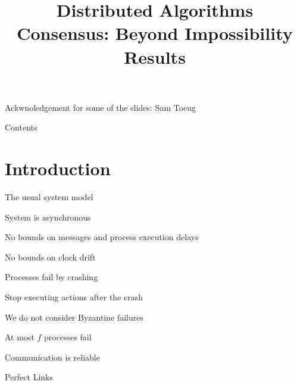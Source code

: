 
\title[DS - FD \& Consensus]{\textbf{Distributed Algorithms}\\Consensus: Beyond Impossibility Results}





\newcommand{\Crashed}{\mathit{crashed}}
\newcommand{\Correct}{\mathit{correct}}
\newcommand{\Suspected}{\mathit{suspected}}
\newcommand{\Est}{\mathit{est}}
\newcommand{\Aux}{\mathit{aux}}
\newcommand{\Rec}{\mathit{rec}}
\newcommand{\Proc}{\mathit{proc}}
\newcommand{\Stop}{\mathit{stop}}

\newcommand{\SUSPECT}{\textsc{suspect}}
\newcommand{\PHASEA}{\textsc{phase1}}
\newcommand{\PHASEB}{\textsc{phase2}}
\newcommand{\DECIDE}{\textsc{decide}}
\newcommand{\REPORT}{\textsc{report}}
\newcommand{\PROPOSAL}{\textsc{proposal}}

\newcommand{\Random}{\fontproc{random}}

\begin{frame}
\titlepage

Ackwnoledgement for some of the slides: Sam Toeug



\end{frame}

\begin{frame}[shrink]{Contents}
\tableofcontents
\end{frame}



\section{Introduction}

\begin{frame}{The usual system model}
	
	
\BIL

\item \alert{System is asynchronous}
	\BI
	\item No bounds on messages and process execution delays
	\item No bounds on clock drift
	\EI
	
\item \alert{Processes fail by crashing}
	\BI
	\item Stop executing actions after the crash
	\item We do not consider Byzantine failures
	\item At most $f$ processes fail
	\EI

\item \alert{Communication is reliable}

	\BI
	\item Perfect Links
	\EI

\EIL

\end{frame}


